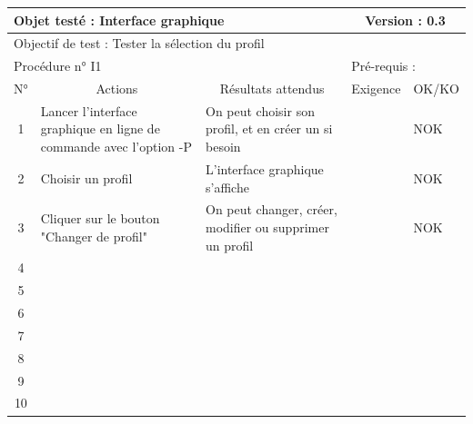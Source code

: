 \documentclass{../res/univ-projet}
\begin{document}
\begin{center}
    \begin{tabular}{|c|p{5cm}|p{5cm}|p{1.5cm}|p{1.5cm}|}
      \hline
      \multicolumn{3}{|l|}{Objet testé : Interface graphique} & \multicolumn{2}{c|}{Version : 0.3}\\ \hline
      \multicolumn{5}{|l|}{Objectif de test : Tester la sélection du profil}\\ \hline
      \multicolumn{3}{|l|}{Procédure n° I1} & \multicolumn{2}{p{3cm}|}{Pré-requis : }\\ \hline
      \multicolumn{1}{|c|}{N°} & \multicolumn{1}{c|}{Actions} & \multicolumn{1}{c|}{Résultats attendus} & 
      \multicolumn{1}{c|}{Exigence} & \multicolumn{1}{c|}{OK/KO}\\ \hline
      1 & Lancer l'interface graphique en ligne de commande avec l'option -P & On peut choisir son profil, et en créer un si besoin &  & NOK \\
      2 & Choisir un profil & L'interface graphique s'affiche &  & NOK \\
      3 & Cliquer sur le bouton "Changer de profil" & On peut changer, créer, modifier ou supprimer un profil &  & NOK \\ 
    4 &  &  &  & \\
      5 &  &  &  & \\
    6 &  &  &  & \\
      7 &  &  &  & \\
      8 &  &  &  & \\
      9 &  &  &  & \\
      10 &  &  &  &\\ 
  \hline
    \end{tabular}
    \vskip 2.2cm


\end{center}
\end{document}
